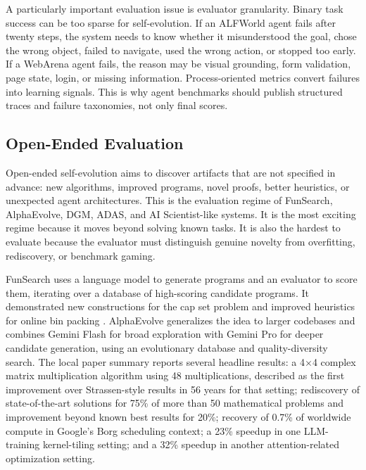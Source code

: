 A particularly important evaluation issue is evaluator granularity. Binary task success can be too sparse for self-evolution. If an ALFWorld agent fails after twenty steps, the system needs to know whether it misunderstood the goal, chose the wrong object, failed to navigate, used the wrong action, or stopped too early. If a WebArena agent fails, the reason may be visual grounding, form validation, page state, login, or missing information. Process-oriented metrics convert failures into learning signals. This is why agent benchmarks should publish structured traces and failure taxonomies, not only final scores.

\subsection{Open-Ended Evaluation}
\label{subsec:open-ended-evaluation}

Open-ended self-evolution aims to discover artifacts that are not specified in advance: new algorithms, improved programs, novel proofs, better heuristics, or unexpected agent architectures. This is the evaluation regime of FunSearch, AlphaEvolve, DGM, ADAS, and AI Scientist-like systems. It is the most exciting regime because it moves beyond solving known tasks. It is also the hardest to evaluate because the evaluator must distinguish genuine novelty from overfitting, rediscovery, or benchmark gaming.

FunSearch uses a language model to generate programs and an evaluator to score them, iterating over a database of high-scoring candidate programs. It demonstrated new constructions for the cap set problem and improved heuristics for online bin packing \cite{funsearch2024}. AlphaEvolve generalizes the idea to larger codebases and combines Gemini Flash for broad exploration with Gemini Pro for deeper candidate generation, using an evolutionary database and quality-diversity search. The local paper summary reports several headline results: a 4$\times$4 complex matrix multiplication algorithm using 48 multiplications, described as the first improvement over Strassen-style results in 56 years for that setting; rediscovery of state-of-the-art solutions for 75\% of more than 50 mathematical problems and improvement beyond known best results for 20\%; recovery of 0.7\% of worldwide compute in Google's Borg scheduling context; a 23\% speedup in one LLM-training kernel-tiling setting; and a 32\% speedup in another attention-related optimization setting.

